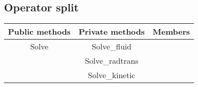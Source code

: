 \subsection{Operator split}
\begin{table}[H]
  \centering
  \begin{tabular}{|c|c|c|}
    \hline
    Public methods & Private methods & Members \\
    \hline
    Solve & Solve\_fluid & \\
          & Solve\_radtrans & \\
          & Solve\_kinetic & \\
    \hline
  \end{tabular}
\end{table}
